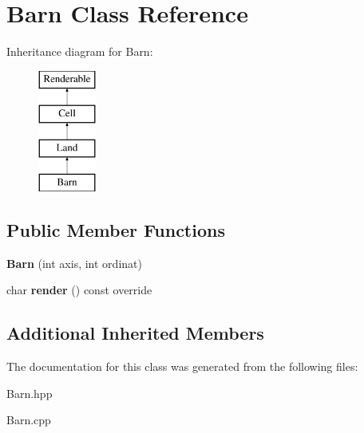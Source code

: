 \hypertarget{class_barn}{}\section{Barn Class Reference}
\label{class_barn}
Inheritance diagram for Barn\+:\begin{figure}[H]
\begin{center}
\leavevmode
\includegraphics[height=4.000000cm]{class_barn}
\end{center}
\end{figure}
\subsection*{Public Member Functions}
\begin{DoxyCompactItemize}
\item 
\mbox{\label{class_barn_ae8aaa556de1b6d3bb78e7fdfcf702f55}} 
{\bfseries Barn} (int axis, int ordinat)
\item 
\mbox{\label{class_barn_ab823bc99099a48de0343f0841b446669}} 
char {\bfseries render} () const override
\end{DoxyCompactItemize}
\subsection*{Additional Inherited Members}


The documentation for this class was generated from the following files\+:\begin{DoxyCompactItemize}
\item 
Barn.\+hpp\item 
Barn.\+cpp\end{DoxyCompactItemize}
